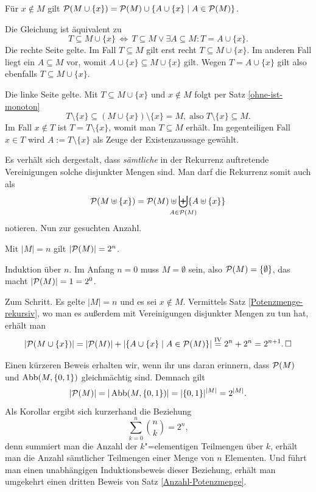 \begin{Satz}%
\label{Potenzmenge-rekursiv}\newlinefirst
Für $x\notin M$ gilt $\mathcal P(M\cup\{x\})
= \mathcal P(M)\cup\{A\cup\{x\}\mid A\in\mathcal P(M)\}$.
\end{Satz}
\begin{Beweis}
Die Gleichung ist äquivalent zu
\[T\subseteq M\cup\{x\}\,\Leftrightarrow\, T\subseteq M\lor\exists A\subseteq M\colon T=A\cup\{x\}.\]
Die rechte Seite gelte. Im Fall $T\subseteq M$ gilt erst
recht $T\subseteq M\cup\{x\}$. Im anderen Fall liegt ein $A\subseteq M$
vor, womit $A\cup\{x\}\subseteq M\cup\{x\}$ gilt. Wegen $T=A\cup\{x\}$
gilt also ebenfalls $T\subseteq M\cup\{x\}$.

Die linke Seite gelte. Mit $T\subseteq M\cup\{x\}$ und
$x\notin M$ folgt per Satz \ref{ohne-ist-monoton}
\[T\setminus\{x\}\subseteq (M\cup\{x\})\setminus\{x\} = M,
\;\text{also}\; T\setminus\{x\}\subseteq M.\]
Im Fall $x\notin T$ ist
$T=T\setminus\{x\}$, womit man $T\subseteq M$
erhält. Im gegenteiligen Fall $x\in T$ wird $A:=T\setminus\{x\}$
als Zeuge der Existenzaussage gewählt.\,\qedsymbol
\end{Beweis}

\noindent
Es verhält sich dergestalt, dass \emph{sämtliche} in der Rekurrenz
auftretende Vereinigungen solche disjunkter Mengen sind. Man darf
die Rekurrenz somit auch als
\[\powerset(M\uplus\{x\})
= \powerset(M)\uplus\biguplus_{\mathclap{A\in\powerset(M)}}
\{A\uplus\{x\}\}\]
notieren. Nun zur gesuchten Anzahl.

\begin{Satz}\label{Anzahl-Potenzmenge}
Mit $|M|=n$ gilt $|\mathcal P(M)| = 2^n$.
\end{Satz}
\begin{Beweis}
Induktion über $n$. Im Anfang $n=0$ muss $M=\emptyset$ sein, also
$\mathcal P(M)=\{\emptyset\}$, das macht $|\mathcal P(M)| = 1 = 2^0$.

Zum Schritt. Es gelte $|M|=n$ und es sei $x\notin M$. Vermittels Satz
\ref{Potenzmenge-rekursiv}, wo man es außerdem mit Vereinigungen
disjunkter Mengen zu tun hat, erhält man
\[|\mathcal P(M\cup\{x\})| = |\mathcal P(M)| + |\{A\cup\{x\}\mid A\in\mathcal P(M)\}|
\stackrel{\text{IV}}= 2^n + 2^n = 2^{n+1}.\,\Box\]
\end{Beweis}

\noindent
Einen kürzeren Beweis erhalten wir, wenn ihr uns daran erinnern, dass
$\mathcal P(M)$ und $\operatorname{Abb}(M,\{0,1\})$ gleichmächtig sind. Demnach gilt
\[|\mathcal P(M)| = |\operatorname{Abb}(M,\{0,1\})| = |\{0,1\}|^{|M|} = 2^{|M|}.\]
Als Korollar ergibt sich kurzerhand die Beziehung
\[\sum_{k=0}^n\binom{n}{k} = 2^n,\]
denn summiert man die Anzahl der $k$"=elementigen Teilmengen über $k$,
erhält man die Anzahl sämtlicher Teilmengen einer Menge von $n$ Elementen.
Und führt man einen unabhängigen Induktionsbeweis dieser Beziehung,
erhält man umgekehrt einen dritten Beweis von Satz \ref{Anzahl-Potenzmenge}.

